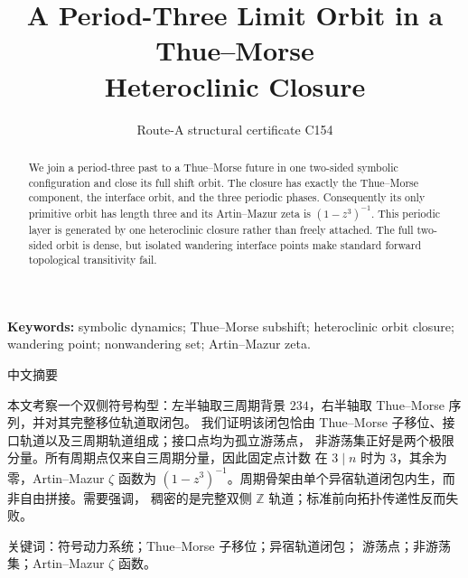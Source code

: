 \documentclass[10pt]{article}
\title{A Period-Three Limit Orbit in a Thue--Morse\\Heteroclinic Closure}
\author{Route-A structural certificate C154}
\date{}
\begin{document}
\maketitle
\begin{abstract}
We join a period-three past to a Thue--Morse future in one two-sided symbolic
configuration and close its full shift orbit.  The closure has exactly the
Thue--Morse component, the interface orbit, and the three periodic phases.
Consequently its only primitive orbit has length three and its Artin--Mazur
zeta is $(1-z^3)^{-1}$.  This periodic layer is generated by one
heteroclinic closure rather than freely attached.  The full two-sided orbit
is dense, but isolated wandering interface points make standard forward
topological transitivity fail.
\end{abstract}
\noindent\textbf{Keywords:} symbolic dynamics; Thue--Morse subshift;
heteroclinic orbit closure; wandering point; nonwandering set; Artin--Mazur
zeta.

\begin{otherlanguage}{chinese-simplified}
\begin{center}{\large 中文摘要}\end{center}
\begin{sloppypar}
本文考察一个双侧符号构型：左半轴取三周期背景 $234$，右半轴取
\foreignlanguage{english}{Thue--Morse} 序列，并对其完整移位轨道取闭包。
我们证明该闭包恰由 \foreignlanguage{english}{Thue--Morse} 子移位、接口轨道以及三周期轨道组成；接口点均为孤立游荡点，
非游荡集正好是两个极限分量。所有周期点仅来自三周期分量，因此固定点计数
在 $3\mid n$ 时为 $3$，其余为零，\foreignlanguage{english}{Artin--Mazur} $\zeta$ 函数为
$(1-z^3)^{-1}$。周期骨架由单个异宿轨道闭包内生，而非自由拼接。需要强调，
稠密的是完整双侧 $\mathbb Z$ 轨道；标准前向拓扑传递性反而失败。
\end{sloppypar}
\noindent 关键词：符号动力系统；\foreignlanguage{english}{Thue--Morse} 子移位；异宿轨道闭包；
游荡点；非游荡集；\foreignlanguage{english}{Artin--Mazur} $\zeta$ 函数。
\end{otherlanguage}
\end{document}
